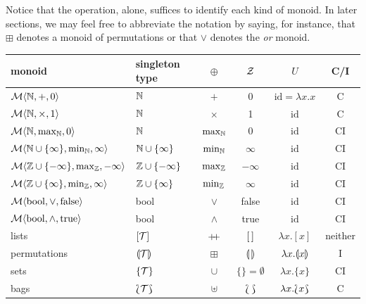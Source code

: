 Notice that the operation, alone, suffices to identify each kind of monoid. In later sections, we may feel free to abbreviate the notation by saying, for instance, that $\boxplus$ denotes a monoid of permutations or that $\lor$ denotes the \emph{or} monoid.


\begin{center}
		\begin{tabular}{|l|l||c||c|c|c|}
		  \hline monoid &
		  singleton type   & $\oplus$        & $\mathcal{Z}$  & $U$         & C/I \\
		      \hline \hline
		  $\mathcal{M}\langle{\mathbb{N}},{+},{0}\rangle$ &
		  $\mathbb{N}$     & $+$             & 0              &
		      $\mathrm{id}=\lambda x.x$                            & C  \\ \hline
		  $\mathcal{M}\langle{\mathbb{N}},{\times},{1}\rangle$ &
		  $\mathbb{N}$     & $\times$        & 1              &
		      $\mathrm{id}$                                        & C  \\ \hline
		  $\mathcal{M}\langle{\mathbb{N}},{\max_{\mathbb{N}}},{0}\rangle$ &
		  $\mathbb{N}$                 & $\max_{\mathbb{N}}$   & 0           &
		      $\mathrm{id}$                                        & CI \\ \hline
		  $\mathcal{M}\langle{\mathbb{N}\cup\{\infty\}},{\min_{\mathbb{N}}},{\infty}\rangle$ &
		  $\mathbb{N}\cup\{\infty\}$   & $\min_{\mathbb{N}}$   & $\infty$    &
		      $\mathrm{id}$                                        & CI \\ \hline
		  $\mathcal{M}\langle{\mathbb{Z}\cup\{-\infty\}},{\max_{\mathbb{Z}}},{-\infty}\rangle$ &
		  $\mathbb{Z}\cup\{-\infty\}$  & $\max_{\mathbb{Z}}$   & $-\infty$   &
		      $\mathrm{id}$                                        & CI \\ \hline
		  $\mathcal{M}\langle{\mathbb{Z}\cup\{\infty\}},{\min_{\mathbb{Z}}},{\infty}\rangle$ &
		  $\mathbb{Z}\cup\{\infty\}$   & $\min_{\mathbb{Z}}$   & $\infty$    &
		      $\mathrm{id}$                                        & CI \\ \hline
		  $\mathcal{M}\langle{\mathrm{bool}},{\lor},{\mathrm{false}}\rangle$ &
		  bool & $\lor$          & false    & $\mathrm{id}$ & CI \\ \hline
		  $\mathcal{M}\langle{\mathrm{bool}},{\land},{\mathrm{true}}\rangle$ &
		  bool & $\land$         & true     & $\mathrm{id}$ & CI \\ \hline
		  \hline
		  lists &
		  $[\mathcal{T}]$            & $\pp$      & $[\,]$ &
		      $\lambda x.[x]$                        & neither \\ \hline
		  permutations &
		  $\llparenthesis \mathcal{T}\rrparenthesis$ & $\boxplus$ & $\llparenthesis\,\rrparenthesis$ &
		      $\lambda x.\llparenthesis x\rrparenthesis$ &I\\ \hline
		  sets &
		  $\{\mathcal{T}\}$          & $\cup$     & $\{\}=\emptyset$  &
		      $\lambda x.\{x\}$                      & CI \\ \hline
		  bags &
		  $\Lbag \mathcal{T}\Rbag$   & $\uplus$   & $\Lbag\,\Rbag$  &
		      $\lambda x.\Lbag x\Rbag$               & C\\ \hline
		\end{tabular}
\end{center}


